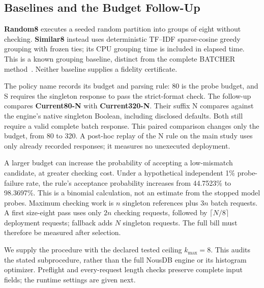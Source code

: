 \subsection{Baselines and the Budget Follow-Up}
\textbf{Random8} executes a seeded random partition into groups of eight without checking. \textbf{Similar8} instead uses deterministic TF--IDF sparse-cosine greedy grouping with frozen ties; its CPU grouping time is included in elapsed time. This is a known grouping baseline, distinct from the complete BATCHER method~\cite{batcher}. Neither baseline supplies a fidelity certificate.

The policy name records its budget and parsing rule: 80 is the probe budget, and S requires the singleton response to pass the strict-format check. The follow-up compares \textbf{Current80-N} with \textbf{Current320-N}. Their suffix N compares against the engine's native singleton Boolean, including disclosed defaults. Both still require a valid complete batch response. This paired comparison changes only the budget, from 80 to 320. A post-hoc replay of the N rule on the main study uses only already recorded responses; it measures no unexecuted deployment.

A larger budget can increase the probability of accepting a low-mismatch candidate, at greater checking cost. Under a hypothetical independent 1\% probe-failure rate, the rule's acceptance probability increases from 44.7523\% to 98.3697\%. This is a binomial calculation, not an estimate from the stopped model probes. Maximum checking work is $n$ singleton references plus $3n$ batch requests. A first size-eight pass uses only $2n$ checking requests, followed by $\lceil N/8\rceil$ deployment requests; fallback adds $N$ singleton requests. The full bill must therefore be measured after selection.

We supply the procedure with the declared tested ceiling $k_{\max}=8$. This audits the stated subprocedure, rather than the full NousDB engine or its histogram optimizer. Preflight and every-request length checks preserve complete input fields; the runtime settings are given next.
